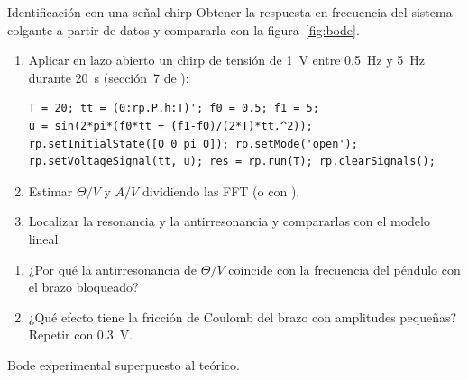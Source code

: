 \label{pr:ident}
\begin{practica}{Identificación con una señal chirp}
\objetivos Obtener la respuesta en frecuencia del sistema colgante a partir de datos y compararla con la figura~\ref{fig:bode}.
\procedimiento
\begin{enumerate}
  \item Aplicar en lazo abierto un chirp de tensión de \SI{1}{V} entre \SI{0.5}{Hz} y \SI{5}{Hz} durante \SI{20}{s} (sección~7 de ):
\begin{lstlisting}
T = 20; tt = (0:rp.P.h:T)'; f0 = 0.5; f1 = 5;
u = sin(2*pi*(f0*tt + (f1-f0)/(2*T)*tt.^2));
rp.setInitialState([0 0 pi 0]); rp.setMode('open');
rp.setVoltageSignal(tt, u); res = rp.run(T); rp.clearSignals();
\end{lstlisting}
  \item Estimar $\Theta/V$ y $A/V$ dividiendo las FFT (o con ).
  \item Localizar la resonancia y la antirresonancia y compararlas con el modelo lineal.
\end{enumerate}
\preguntas
\begin{enumerate}
  \item ¿Por qué la antirresonancia de $\Theta/V$ coincide con la frecuencia del péndulo con el brazo bloqueado?
  \item ¿Qué efecto tiene la fricción de Coulomb del brazo con amplitudes pequeñas? Repetir con \SI{0.3}{V}.
\end{enumerate}
\entregables Bode experimental superpuesto al teórico.
\end{practica}

